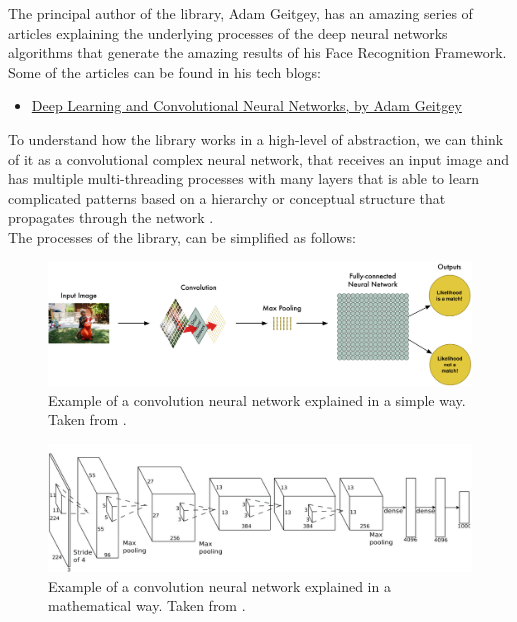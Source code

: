 \documentclass[11pt]{report} %
\begin{document}
The principal author of the library, Adam Geitgey, has an amazing series of articles explaining the underlying processes of the deep neural networks algorithms that generate the amazing results of his Face Recognition Framework. Some of the articles can be found in his tech blogs:

\begin{itemize}
    \color{blue}
    \item \href{https://medium.com/@ageitgey/machine-learning-is-fun-part-3-deep-learning-and-convolutional-neural-networks-f40359318721}{Deep Learning and Convolutional Neural Networks, by Adam Geitgey}
\end{itemize}

To understand how the library works in a high-level of abstraction, we can think of it as a convolutional complex neural network, that receives an input image and has multiple multi-threading processes with many layers that is able to learn complicated patterns based on a hierarchy or conceptual structure that propagates through the network \citep{cite_face_detect_face_recognition_github_repo}.\\

The processes of the library, can be simplified as follows:

\begin{figure}[H]
    \centering
    \includegraphics[width=1.01\linewidth]{assets/imgs/computer_vision/face_recognition_convolutional_neural_network_explained.png}
    \caption{Example of a convolution neural network explained in a simple way. Taken from \citep{cite_adam_geitgey_machine_learning_convolutional_network_fun}.} 
    \label{fig_convolutional_neural_network_easy}
\end{figure}

\begin{figure}[H]
    \centering
    \includegraphics[width=1.01\linewidth]{assets/imgs/computer_vision/face_recognition_convolutional_neural_network_more_steps.png}
    \caption{Example of a convolution neural network explained in a mathematical way. Taken from \citep{cite_adam_geitgey_machine_learning_convolutional_network_fun}.} 
    \label{fig_convolutional_neural_network_complex}
\end{figure}
\end{document}
